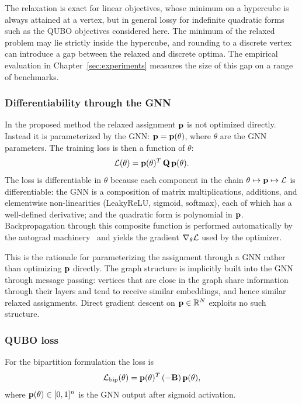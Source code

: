 The relaxation is exact for linear objectives, whose minimum on a
hypercube is always attained at a vertex, but in general lossy for
indefinite quadratic forms such as the QUBO objectives considered
here. The minimum of the relaxed problem may lie strictly inside
the hypercube, and rounding to a discrete vertex can introduce a
gap between the relaxed and discrete optima. The empirical
evaluation in Chapter~\ref{sec:experiments} measures the size of
this gap on a range of benchmarks.


\subsubsection{Differentiability through the GNN}
\label{sec:method_differentiability}

In the proposed method the relaxed assignment $\mathbf{p}$ is not optimized
directly. Instead it is parameterized by the GNN: $\mathbf{p} =
\mathbf{p}(\theta)$, where $\theta$ are the GNN parameters. The training
loss is then a function of $\theta$:
\begin{equation*}
    \mathcal{L}(\theta) = \mathbf{p}(\theta)^T \, \mathbf{Q} \, \mathbf{p}(\theta).
\end{equation*}
The loss is differentiable in $\theta$ because each component in
the chain $\theta \mapsto \mathbf{p} \mapsto \mathcal{L}$ is differentiable: the
GNN is a composition of matrix multiplications, additions, and
elementwise non-linearities (LeakyReLU, sigmoid, softmax), each of
which has a well-defined derivative; and the quadratic form is
polynomial in $\mathbf{p}$. Backpropagation through this composite
function is performed automatically by the autograd
machinery~\cite{paszke2019pytorch} and yields the gradient
$\nabla_\theta \mathcal{L}$ used by the optimizer.

This is the rationale for parameterizing the assignment through a
GNN rather than optimizing $\mathbf{p}$ directly. The graph structure is
implicitly built into the GNN through message passing: vertices
that are close in the graph share information through their layers
and tend to receive similar embeddings, and hence similar relaxed
assignments. Direct gradient descent on $\mathbf{p} \in \mathbb{R}^N$
exploits no such structure.


\subsubsection{QUBO loss}
\label{sec:method_qubo_loss}

For the bipartition formulation the loss is
\begin{equation}
    \mathcal{L}_{\mathrm{bip}}(\theta) = \mathbf{p}(\theta)^T \, (-\mathbf{B}) \,
    \mathbf{p}(\theta),
    \label{eq:loss_bipartition}
\end{equation}
where $\mathbf{p}(\theta) \in [0,1]^n$ is the GNN output after sigmoid
activation.

